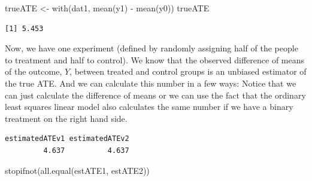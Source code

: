 \documentclass[
  12pt,
]{book}
\newenvironment{Shaded}{\begin{snugshade}}{\end{snugshade}}
\newcommand{\AttributeTok}[1]{\textcolor[rgb]{0.77,0.63,0.00}{#1}}
\newcommand{\DecValTok}[1]{\textcolor[rgb]{0.00,0.00,0.81}{#1}}
\newcommand{\DocumentationTok}[1]{\textcolor[rgb]{0.56,0.35,0.01}{\textbf{\textit{#1}}}}
\newcommand{\FunctionTok}[1]{\textcolor[rgb]{0.00,0.00,0.00}{#1}}
\newcommand{\NormalTok}[1]{#1}
\newcommand{\OtherTok}[1]{\textcolor[rgb]{0.56,0.35,0.01}{#1}}
\newcommand{\SpecialCharTok}[1]{\textcolor[rgb]{0.00,0.00,0.00}{#1}}
\newcommand{\StringTok}[1]{\textcolor[rgb]{0.31,0.60,0.02}{#1}}
\theoremstyle{definition}
\theoremstyle{definition}
\theoremstyle{definition}
\theoremstyle{remark}
\begin{document}
\begin{Shaded}
\begin{Highlighting}[]
\NormalTok{trueATE }\OtherTok{\textless{}{-}} \FunctionTok{with}\NormalTok{(dat1, }\FunctionTok{mean}\NormalTok{(y1) }\SpecialCharTok{{-}} \FunctionTok{mean}\NormalTok{(y0))}
\NormalTok{trueATE}
\end{Highlighting}
\end{Shaded}

\begin{verbatim}
[1] 5.453
\end{verbatim}

Now, we have one experiment (defined by randomly assigning half of the
people to treatment and half to control). We know that the observed
difference of means of the outcome, \(Y\), between treated and control
groups is an unbiased estimator of the true ATE. And we can calculate
this number in a few ways: Notice that we can just calculate the
difference of means or we can use the fact that the ordinary least
squares linear model also calculates the same number if we have a binary
treatment on the right hand side.

\begin{Shaded}
\end{Shaded}

\begin{verbatim}
estimatedATEv1 estimatedATEv2 
         4.637          4.637 
\end{verbatim}

\begin{Shaded}
\begin{Highlighting}[]
\FunctionTok{stopifnot}\NormalTok{(}\FunctionTok{all.equal}\NormalTok{(estATE1, estATE2))}
\end{Highlighting}
\end{Shaded}
\end{document}
